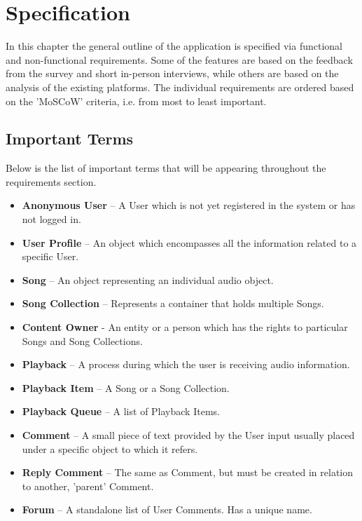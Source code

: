 \chapter{Specification}
In this chapter the general outline of the application is specified via functional and non-functional requirements.
Some of the features are based on the feedback from the survey and short in-person interviews,
while others are based on the analysis of the existing platforms.
The individual requirements are ordered based on the 'MoSCoW' criteria, i.e. from most to least important.



\section{Important Terms}

Below is the list of important terms that will be appearing throughout the requirements section.

\begin{itemize}
    \item \textbf{Anonymous User} – A User which is not yet registered in the system or has not logged in.
    \item \textbf{User Profile} – An object which encompasses all the information related to a specific User.
    \item \textbf{Song} – An object representing an individual audio object.
    \item \textbf{Song Collection} – Represents a container that holds multiple Songs.
    \item \textbf{Content Owner} - An entity or a person which has the rights to particular Songs and Song Collections.
    \item \textbf{Playback} – A process during which the user is receiving audio information.
    \item \textbf{Playback Item} – A Song or a Song Collection.
    \item \textbf{Playback Queue} – A list of Playback Items.
    \item \textbf{Comment} – A small piece of text provided by the User input usually placed under a specific object to which it refers.
    \item \textbf{Reply Comment} – The same as Comment, but must be created in relation to another, 'parent' Comment.
    \item \textbf{Forum} – A standalone list of User Comments. Has a unique name.
\end{itemize}


